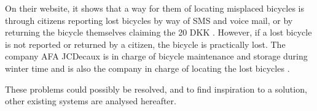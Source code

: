 On their website, it shows that a way for them of locating misplaced bicycles is through citizens reporting lost bicycles by way of SMS and voice mail, or by returning the bicycle themselves claiming the 20 DKK \citep{misc:aalborgbycykelmangler}.
However, if a lost bicycle is not reported or returned by a citizen, the bicycle is practically lost.
The company AFA JCDecaux is in charge of bicycle maintenance and storage during winter time and is also the company in charge of locating the lost bicycles \citep{misc:aalborgcykling}.


These problems could possibly be resolved, and to find inspiration to a solution, other existing systems are analysed hereafter.